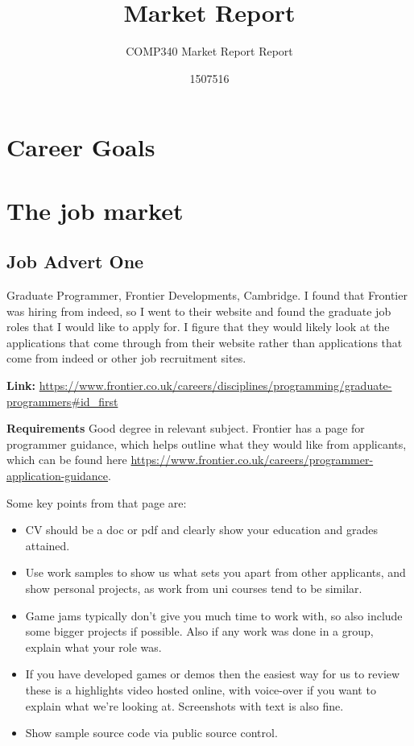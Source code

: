 \documentclass{scrartcl}
\title{Market Report}
\subtitle{COMP340 Market Report Report}
\author{1507516}
\begin{document}
\maketitle


\section{Career Goals}

\section{The job market}




\subsection{Job Advert One}
Graduate Programmer, Frontier Developments, Cambridge. 
I found that Frontier was hiring from indeed, so I went to their website and found the graduate job roles that I would like to apply for. I figure that they would likely look at the applications that come through from their website rather than applications that come from indeed or other job recruitment sites.

\textbf{Link: }
\url{https://www.frontier.co.uk/careers/disciplines/programming/graduate-programmers#id_first} \cite{JobOne}

\textbf{Requirements}
Good degree in relevant subject.
 Frontier has a page for programmer guidance, which helps outline what they would like from applicants, which can be found here \url{https://www.frontier.co.uk/careers/programmer-application-guidance}.

Some key points from that page are:
\begin{itemize}
	\item CV should be a doc or pdf and clearly show your education and grades attained.
	\item Use work samples to show us what sets you apart from other applicants, and show personal projects, as work from uni courses tend to be similar.
	\item Game jams typically don't give you much time to work with, so also include some bigger projects if possible. Also if any work was done in a group, explain what your role was.
	\item If you have developed games or demos then the easiest way for us to review these is a highlights video hosted online, with voice-over if you want to explain what we're looking at. Screenshots with text is also fine.
	\item Show sample source code via public source control.
\end{itemize}
\end{document}
